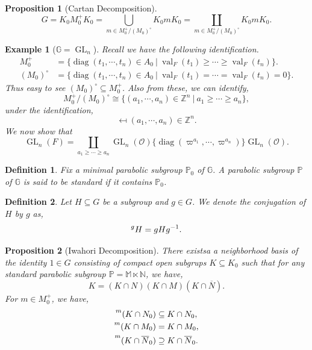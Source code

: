 \documentclass[8pt]{article}
\newtheorem{proposition}{Proposition}[section]
\newtheorem{definition}{Definition}[section]
\newtheorem{example}{Example}[section]
\DeclareMathOperator{\GL}{GL}
\DeclareMathOperator{\val}{val}
\DeclareMathOperator{\diag}{diag}
\newcommand{\N}[0]{\mathbb{N}}
\newcommand{\Z}[0]{\mathbb{Z}}
\newcommand{\G}[0]{\mathbb{G}}
\newcommand{\Para}[0]{\mathbb{P}}
\newcommand{\M}[0]{\mathbb{M}}
\newcommand{\sep}[0]{\:|\:}
\begin{document}
\begin{proposition}[Cartan Decomposition]
  \begin{equation*}
    G=K_0M_0^+K_0  =\bigcup_{m\in M_0^+/(M_0)^\circ}K_0 mK_0 = \coprod_{m\in M_0^+/(M_0)^\circ}K_0 mK_0.
  \end{equation*}
\end{proposition}

\begin{example}[$\G=\GL_n$]
  Recall we have the following identification.
  \begin{align*}
    M_0^+ & = \{\diag(t_1,\cdots,t_n)\in A_0\sep \val_F(t_1)\geq\cdots\geq \val_F(t_n)\}.\\
    (M_0)^\circ & = \{\diag(t_1,\cdots,t_n)\in A_0\sep \val_F(t_1)=\cdots= \val_F(t_n)=0\}.
  \end{align*}
  Thus easy to see $(M_0)^\circ\subseteq M_0^+$. Also from these, we can identify,
  \begin{equation*}
    M_0^+/(M_0)^\circ \cong \{(a_1,\cdots,a_n)\in\Z^n\sep a_1\geq\cdots\geq a_n\},
  \end{equation*}
  under the identification,
  \begin{equation*}
    [\diag(\varpi^{a_1},\cdots,\varpi^{a_n})]\mapsfrom(a_1,\cdots,a_n)\in\Z^n.
  \end{equation*}
  We now show that 
  \begin{equation*}
    \GL_n(F) = \coprod_{a_1\geq\cdots\geq a_n}\GL_n(\mathcal{O})\{\diag(\varpi^{a_1},\cdots,\varpi^{a_n})\}\GL_n(\mathcal{O}).
  \end{equation*}
\end{example}

\begin{definition}
  Fix a minimal parabolic subgroup $\Para_0$ of $\G$. A parabolic subgroup $\Para$ of $\G$ is said to be standard if it contains $\Para_0$.
\end{definition}

\begin{definition}
  Let $H\subseteq G$ be a subgroup and $g\in G$. We denote the conjugation of $H$ by $g$ as,
  \begin{equation*}
    \prescript{g}{}{H} = gHg^{-1}.
  \end{equation*}
\end{definition}

\begin{proposition}[Iwahori Decomposition]
  There existsa a neighborhood basis of the identity $1\in G$ consisting of compact open subgrups $K\subseteq K_0$ such that for any standard parabolic subgroup $\Para = \M\ltimes\N$, we have,
  \begin{equation*}
    K = (K\cap N)(K\cap M)(K\cap\overline{N}).
  \end{equation*}
  For $m\in M_0^+$, we have,
  \begin{align*}
    \prescript{m}{}{(K\cap N_0)}&\subseteq K\cap N_0,\\
     \prescript{m}{}{(K\cap M_0)}&= K\cap M_0,\\
      \prescript{m}{}{(K\cap \overline{N}_0)}&\supseteq K\cap \overline{N}_0.
  \end{align*}
\end{proposition}
\end{document}
